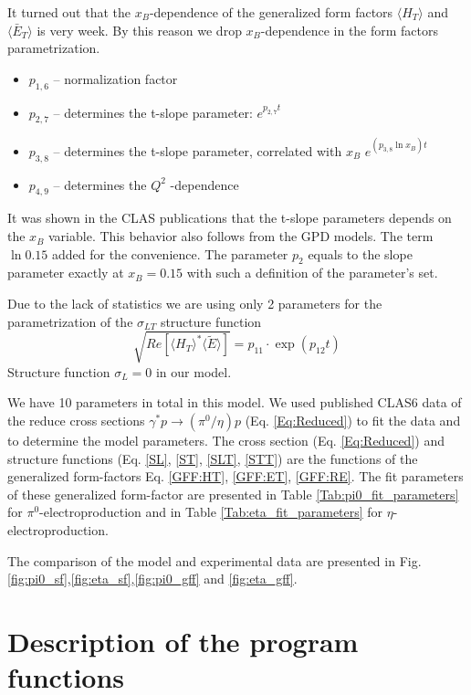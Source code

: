 \documentclass[prc,floatfix,superscriptaddress]{revtex4}
\newcommand{\GPDtE}{\langle \tilde{E} \rangle}
\newcommand{\GPDHT}{\langle H_T \rangle}
\newcommand{\HT}{\langle H_T \rangle}
\newcommand{\ETbar}{\langle \bar{E}_T \rangle}
\begin{document}
It turned out that the $x_B$-dependence of the generalized form factors $\HT$ and $\ETbar$ is very week. By this reason we drop $x_B$-dependence
in the form factors parametrization.
\begin{itemize}
\item $p_{1,6}$ -- normalization factor
\item $p_{2,7}$ --  determines the t-slope parameter: $e^{p_{2,7}t}$
\item $p_{3,8}$ -- determines the t-slope parameter, correlated with  $x_B$ $e^{(p_{3,8}\ln{x_B} )t}$
\item $p_{4,9}$ -- determines the $Q^2$ -dependence
\end{itemize}
It was shown in the CLAS publications \cite{clas2,clas3} that the t-slope parameters depends on the $x_B$ variable. This behavior also follows from the GPD models.
The term $\ln0.15$ added for the convenience. The parameter $p_2$ equals to the slope parameter exactly at $x_B=0.15$ with such a definition of the parameter's set.

Due to the lack of statistics we are using only 2 parameters for the parametrization of the $\sigma_{LT}$ structure function
\begin{equation}
\label{GFF:RE}
\sqrt{Re[\GPDHT^*\GPDtE]}=p_{11}\cdot \exp(p_{12}t)
\end{equation}
Structure function $\sigma_L=0$ in our model.

 We have 10 parameters in total in this model.  We used published CLAS6 data \cite{clas2,clas3} of the  reduce cross sections 
$\gamma^*p\to (\pi^0/\eta) p$ 
(Eq. \ref{Eq:Reduced})  to fit the data and to determine the model parameters.
The cross section (Eq. \ref{Eq:Reduced}) and structure functions (Eq. \ref{SL}, \ref{ST}, \ref{SLT}, \ref{STT}) are the functions of the generalized form-factors Eq. \ref{GFF:HT}, \ref{GFF:ET}, \ref{GFF:RE}. The fit parameters of these generalized form-factor are presented in 
Table \ref{Tab:pi0_fit_parameters} for $\pi^0$-electroproduction and in 
Table \ref{Tab:eta_fit_parameters} for $\eta$-electroproduction.

The comparison of the model and experimental data are presented in Fig. \ref{fig:pi0_sf},\ref{fig:eta_sf},\ref{fig:pi0_gff} and \ref{fig:eta_gff}.

\section{Description of the program functions}
\end{document}
